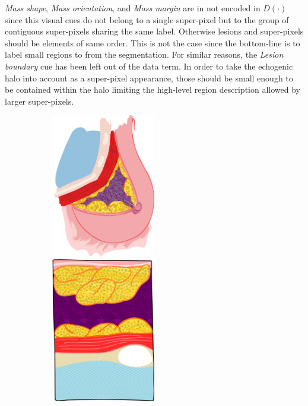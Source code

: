\emph{Mass shape}, \emph{Mass orientation}, and \emph{Mass margin} are in not encoded in $D(\cdot)$ since this visual cues do not belong to a single super-pixel but to the group of contiguous super-pixels sharing the same label. 
Otherwise lesions and super-pixels should be elements of same order.
This is not the case since the bottom-line is to label small regions to from the segmentation.
For similar reasons, the \emph{Lesion boundary} cue has been left out of the data term.
In order to take the echogenic halo into account as a super-pixel appearance, those should be small enough to be contained within the halo limiting the high-level region description allowed by larger super-pixels.


\begin{figure}
    \centering
    \begin{subfigure}[b]{0.28\textwidth}
        \centering
        \includegraphics[width=0.5\textwidth]{breast}
        \includegraphics[width=0.5\textwidth]{slice}

\end{subfigure}
\end{figure}
